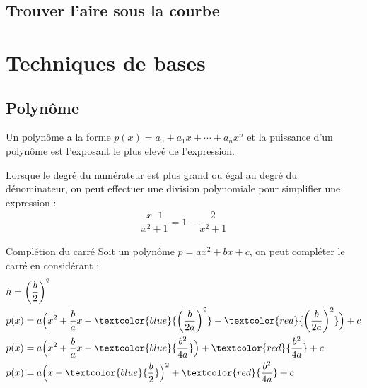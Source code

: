 \documentclass{report}
\begin{document}
\begin{multicols*}{3}
\section{Trouver l'aire sous la courbe}


\chapter{Techniques de bases}
\section{Polynôme}
\begin{Definitionx*}{}{}
  Un polynôme a la forme $p(x) = a_0 + a_1x + \cdots + a_nx^n$ et la \textcolor{myb}{puissance} d'un polynôme 
  est l'exposant le plus elevé de l'expression.    
\end{Definitionx*}

\begin{note}{}{}
    Lorsque le degré du numérateur est plus grand ou égal au degré du dénominateur, on peut effectuer une division 
    polynomiale pour simplifier une expression : 
    \begin{align*}
      \dfrac{x^-1}{x^2 +1} = 1 - \dfrac{2}{x^2 +1}
    \end{align*}
\end{note}



\begin{Concept}{Complétion du carré}{}
  Soit un polynôme $p = ax^2 + bx + c$, on peut compléter le carré en considérant : 
  \begin{align*}
  &h = \left(\dfrac{b}{2}\right)^2 \\ 
  &p(x) = a\Bigl(x^2 + \dfrac{b}{a}x - \textcolor{blue}{\left(\dfrac{b}{2a}\right)^2} 
  - \textcolor{red}{\left(\dfrac{b}{2a}\right)^2}\Bigr)  + c               
  \\
  &p(x) = a\Bigl(x^2 + \dfrac{b}{a} x - \textcolor{blue}{\dfrac{b^2}{4a}}\Bigr) + \textcolor{red}{\dfrac{b^2}{4a}}  + c   
  \\
  &p(x) = a\Bigl(x - \textcolor{blue}{\dfrac{b}{2}}\Bigr)^2 +  
  \textcolor{red}{\dfrac{b^2}{4a}}  + c  
  \end{align*}


  
\end{Concept}

\end{multicols*}
\end{document}
